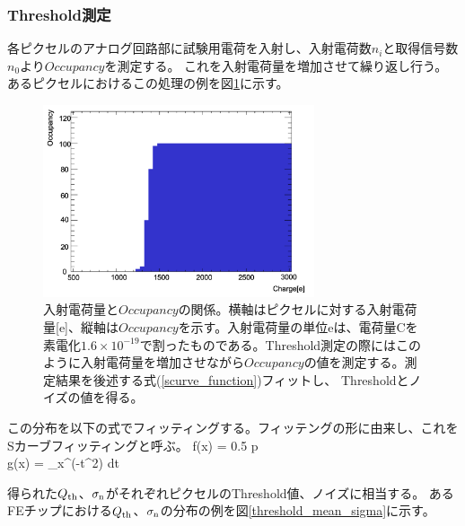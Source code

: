 \subsubsection{Threshold測定}
各ピクセルのアナログ回路部に試験用電荷を入射し、入射電荷数$n_i$と取得信号数$n_0$より$Occupancy$を測定する。
これを入射電荷量を増加させて繰り返し行う。
あるピクセルにおけるこの処理の例を図\ref{threshold_scurve}に示す。
\begin{figure}[bpt]\centering
\includegraphics[width=8cm]{threshold_scurve}
\caption[入射電荷量と$Occupancy$の関係]{入射電荷量と$Occupancy$の関係。横軸はピクセルに対する入射電荷量[e]、縦軸は$Occupancy$を示す。入射電荷量の単位eは、電荷量Cを素電化$1.6\times 10^{-19}$で割ったものである。Threshold測定の際にはこのように入射電荷量を増加させながら$Occupancy$の値を測定する。測定結果を後述する式(\ref{scurve_function})フィットし、 Thresholdとノイズの値を得る。}
\label{threshold_scurve}
\end{figure}

この分布を以下の式でフィッティングする。フィッテングの形に由来し、これをSカーブフィッティングと呼ぶ。
\bbb
\label{scurve_function}
f(x) = 0.5 \times {} \times p\\
g(x) =  \int_x^(-t^2) {\rm d}t
\eee


得られた$Q_{\rm th}$、$\sigma_{\rm n}$がそれぞれピクセルのThreshold値、ノイズに相当する。
あるFEチップにおける$Q_{\rm th}$、$\sigma_{\rm n}$の分布の例を図\ref{threshold_mean_sigma}に示す。

